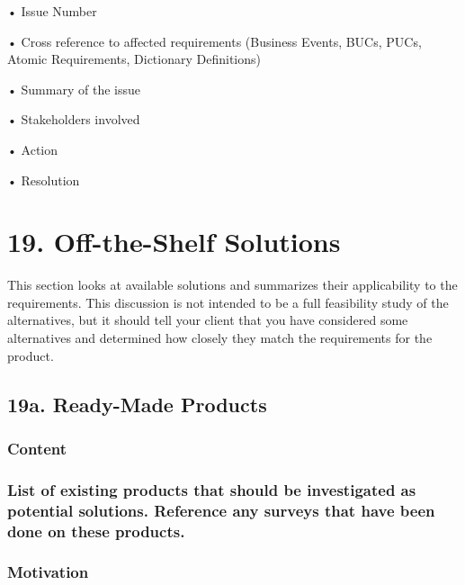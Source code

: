 \documentclass[
]{article}
\begin{document}
• Issue Number

• Cross reference to affected requirements (Business Events, BUCs, PUCs,
Atomic Requirements, Dictionary Definitions)

• Summary of the issue

• Stakeholders involved

• Action

• Resolution

\hypertarget{off-the-shelf-solutions}{%
\section{19. Off-the-Shelf Solutions}\label{off-the-shelf-solutions}}

This section looks at available solutions and summarizes their
applicability to the requirements. This discussion is not intended to be
a full feasibility study of the alternatives, but it should tell your
client that you have considered some alternatives and determined how
closely they match the requirements for the product.

\hypertarget{a.-ready-made-products}{%
\subsection{19a. Ready-Made Products}\label{a.-ready-made-products}}

\hypertarget{content-61}{%
\subsubsection{Content}\label{content-61}}

\hypertarget{list-of-existing-products-that-should-be-investigated-as-potential-solutions.-reference-any-surveys-that-have-been-done-on-these-products.}{%
\subsubsection{List of existing products that should be investigated as
potential solutions. Reference any surveys that have been done on these
products.}\label{list-of-existing-products-that-should-be-investigated-as-potential-solutions.-reference-any-surveys-that-have-been-done-on-these-products.}}

\hypertarget{motivation-60}{%
\subsubsection{Motivation}\label{motivation-60}}
\end{document}
